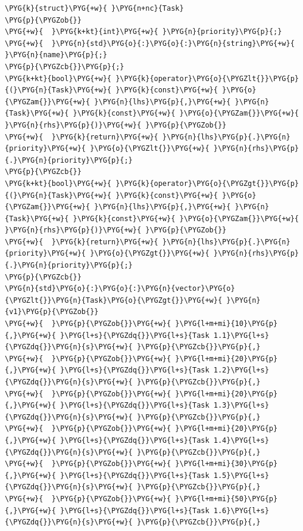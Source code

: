 \begin{codeblockbg}
\begin{Verbatim}[commandchars=\\\{\},breaklines=true,breakanywhere=true,fontsize=\codefont,xleftmargin=17bp]
\PYG{k}{struct}\PYG{+w}{ }\PYG{n+nc}{Task}
\PYG{p}{\PYGZob{}}
\PYG{+w}{  }\PYG{k+kt}{int}\PYG{+w}{ }\PYG{n}{priority}\PYG{p}{;}
\PYG{+w}{  }\PYG{n}{std}\PYG{o}{:}\PYG{o}{:}\PYG{n}{string}\PYG{+w}{ }\PYG{n}{name}\PYG{p}{;}
\PYG{p}{\PYGZcb{}}\PYG{p}{;}
\PYG{k+kt}{bool}\PYG{+w}{ }\PYG{k}{operator}\PYG{o}{\PYGZlt{}}\PYG{p}{(}\PYG{n}{Task}\PYG{+w}{ }\PYG{k}{const}\PYG{+w}{ }\PYG{o}{\PYGZam{}}\PYG{+w}{ }\PYG{n}{lhs}\PYG{p}{,}\PYG{+w}{ }\PYG{n}{Task}\PYG{+w}{ }\PYG{k}{const}\PYG{+w}{ }\PYG{o}{\PYGZam{}}\PYG{+w}{ }\PYG{n}{rhs}\PYG{p}{)}\PYG{+w}{ }\PYG{p}{\PYGZob{}}
\PYG{+w}{  }\PYG{k}{return}\PYG{+w}{ }\PYG{n}{lhs}\PYG{p}{.}\PYG{n}{priority}\PYG{+w}{ }\PYG{o}{\PYGZlt{}}\PYG{+w}{ }\PYG{n}{rhs}\PYG{p}{.}\PYG{n}{priority}\PYG{p}{;}
\PYG{p}{\PYGZcb{}}
\PYG{k+kt}{bool}\PYG{+w}{ }\PYG{k}{operator}\PYG{o}{\PYGZgt{}}\PYG{p}{(}\PYG{n}{Task}\PYG{+w}{ }\PYG{k}{const}\PYG{+w}{ }\PYG{o}{\PYGZam{}}\PYG{+w}{ }\PYG{n}{lhs}\PYG{p}{,}\PYG{+w}{ }\PYG{n}{Task}\PYG{+w}{ }\PYG{k}{const}\PYG{+w}{ }\PYG{o}{\PYGZam{}}\PYG{+w}{ }\PYG{n}{rhs}\PYG{p}{)}\PYG{+w}{ }\PYG{p}{\PYGZob{}}
\PYG{+w}{  }\PYG{k}{return}\PYG{+w}{ }\PYG{n}{lhs}\PYG{p}{.}\PYG{n}{priority}\PYG{+w}{ }\PYG{o}{\PYGZgt{}}\PYG{+w}{ }\PYG{n}{rhs}\PYG{p}{.}\PYG{n}{priority}\PYG{p}{;}
\PYG{p}{\PYGZcb{}}
\PYG{n}{std}\PYG{o}{:}\PYG{o}{:}\PYG{n}{vector}\PYG{o}{\PYGZlt{}}\PYG{n}{Task}\PYG{o}{\PYGZgt{}}\PYG{+w}{ }\PYG{n}{v1}\PYG{p}{\PYGZob{}}
\PYG{+w}{  }\PYG{p}{\PYGZob{}}\PYG{+w}{ }\PYG{l+m+mi}{10}\PYG{p}{,}\PYG{+w}{ }\PYG{l+s}{\PYGZdq{}}\PYG{l+s}{Task 1.1}\PYG{l+s}{\PYGZdq{}}\PYG{n}{s}\PYG{+w}{ }\PYG{p}{\PYGZcb{}}\PYG{p}{,}
\PYG{+w}{  }\PYG{p}{\PYGZob{}}\PYG{+w}{ }\PYG{l+m+mi}{20}\PYG{p}{,}\PYG{+w}{ }\PYG{l+s}{\PYGZdq{}}\PYG{l+s}{Task 1.2}\PYG{l+s}{\PYGZdq{}}\PYG{n}{s}\PYG{+w}{ }\PYG{p}{\PYGZcb{}}\PYG{p}{,}
\PYG{+w}{  }\PYG{p}{\PYGZob{}}\PYG{+w}{ }\PYG{l+m+mi}{20}\PYG{p}{,}\PYG{+w}{ }\PYG{l+s}{\PYGZdq{}}\PYG{l+s}{Task 1.3}\PYG{l+s}{\PYGZdq{}}\PYG{n}{s}\PYG{+w}{ }\PYG{p}{\PYGZcb{}}\PYG{p}{,}
\PYG{+w}{  }\PYG{p}{\PYGZob{}}\PYG{+w}{ }\PYG{l+m+mi}{20}\PYG{p}{,}\PYG{+w}{ }\PYG{l+s}{\PYGZdq{}}\PYG{l+s}{Task 1.4}\PYG{l+s}{\PYGZdq{}}\PYG{n}{s}\PYG{+w}{ }\PYG{p}{\PYGZcb{}}\PYG{p}{,}
\PYG{+w}{  }\PYG{p}{\PYGZob{}}\PYG{+w}{ }\PYG{l+m+mi}{30}\PYG{p}{,}\PYG{+w}{ }\PYG{l+s}{\PYGZdq{}}\PYG{l+s}{Task 1.5}\PYG{l+s}{\PYGZdq{}}\PYG{n}{s}\PYG{+w}{ }\PYG{p}{\PYGZcb{}}\PYG{p}{,}
\PYG{+w}{  }\PYG{p}{\PYGZob{}}\PYG{+w}{ }\PYG{l+m+mi}{50}\PYG{p}{,}\PYG{+w}{ }\PYG{l+s}{\PYGZdq{}}\PYG{l+s}{Task 1.6}\PYG{l+s}{\PYGZdq{}}\PYG{n}{s}\PYG{+w}{ }\PYG{p}{\PYGZcb{}}\PYG{p}{,}

\end{Verbatim}
\end{codeblockbg}
